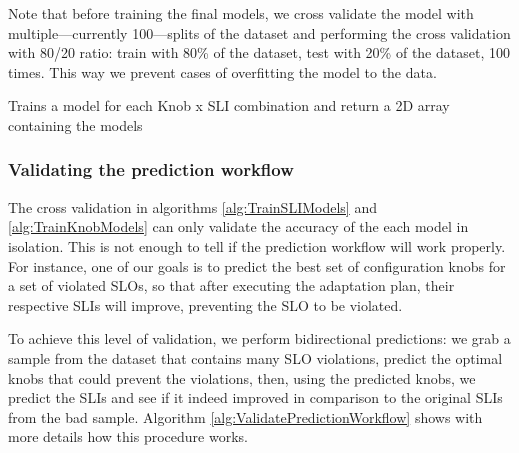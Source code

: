 Note that before training the final models, we cross validate the model with multiple---currently 100---splits of the dataset and performing the cross validation with 80/20 ratio: train with 80\% of the dataset, test with 20\% of the dataset, 100 times. This way we prevent cases of overfitting the model to the data.

\begin{algorithm}
  \SetAlgoNoLine
  \caption{Trains a model for each Knob x SLI combination and return a 2D array containing the models}\label{alg:TrainKnobModels}

\end{algorithm}

\subsubsection{Validating the prediction workflow}

The cross validation in algorithms \ref{alg:TrainSLIModels} and \ref{alg:TrainKnobModels} can only validate the accuracy of the each model in isolation. This is not enough to tell if the prediction workflow will work properly. For instance, one of our goals is to predict the best set of configuration knobs for a set of violated SLOs, so that after executing the adaptation plan, their respective SLIs will improve, preventing the SLO to be violated.

To achieve this level of validation, we perform bidirectional predictions: we grab a sample from the dataset that contains many SLO violations, predict the optimal knobs that could prevent the violations, then, using the predicted knobs, we predict the SLIs and see if it indeed improved in comparison to the original SLIs from the bad sample. Algorithm \ref{alg:ValidatePredictionWorkflow} shows with more details how this procedure works. 

